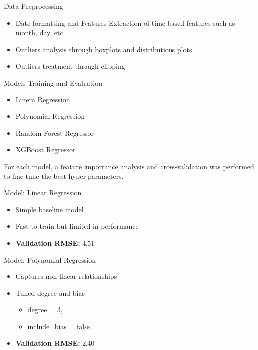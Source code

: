 \documentclass{beamer}
\begin{document}
\begin{frame}{Data Preprocessing}
  \begin{itemize}
    \item Date formatting and Features Extraction of time-based features such as month, day, etc.
    \item Outliers analysis through boxplots and distributions plots
    \item Outliers treatment through clipping
  \end{itemize}
\end{frame}

\begin{frame}{Models Training and Evaluation}
  \begin{itemize}
    \item Linera Regression
    \item Polynomial Regression
    \item Random Forest Regressor
    \item XGBoost Regressor
  \end{itemize}
  
  
  For each model, a feature importance analysis and cross-validation was performed to fine-tune the best hyper parameters.
\end{frame}
    

\begin{frame}{Model: Linear Regression}
  \begin{itemize}
    \item Simple baseline model
    \item Fast to train but limited in performance
    \item \textbf{Validation RMSE:} 4.51
  \end{itemize}
\end{frame}

\begin{frame}{Model: Polynomial Regression}
  \begin{itemize}
    \item Captures non-linear relationships
    \item Tuned degree and bias 
        \begin{itemize}
            \item degree = 3,
            \item include\_bias = false
        \end{itemize}  
    \item \textbf{Validation RMSE:} 2.40
  \end{itemize}
\end{frame}
\end{document}
